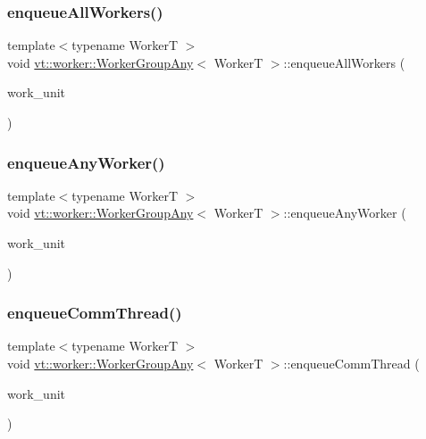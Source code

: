 \subsubsection{\texorpdfstring{enqueue\+All\+Workers()}{enqueueAllWorkers()}}
{\footnotesize\ttfamily template$<$typename WorkerT $>$ \\
void \hyperlink{structvt_1_1worker_1_1_worker_group_any}{vt\+::worker\+::\+Worker\+Group\+Any}$<$ WorkerT $>$\+::enqueue\+All\+Workers (\begin{DoxyParamCaption}\item[{\hyperlink{namespacevt_1_1worker_a59d2fcdafa81fc0af7f921a258e42202}{Work\+Unit\+Type} const \&}]{work\+\_\+unit }\end{DoxyParamCaption})}

\mbox{\label{structvt_1_1worker_1_1_worker_group_any_a9f8a255853db11824212dcba4faaaf13}} 
\subsubsection{\texorpdfstring{enqueue\+Any\+Worker()}{enqueueAnyWorker()}}
{\footnotesize\ttfamily template$<$typename WorkerT $>$ \\
void \hyperlink{structvt_1_1worker_1_1_worker_group_any}{vt\+::worker\+::\+Worker\+Group\+Any}$<$ WorkerT $>$\+::enqueue\+Any\+Worker (\begin{DoxyParamCaption}\item[{\hyperlink{namespacevt_1_1worker_a59d2fcdafa81fc0af7f921a258e42202}{Work\+Unit\+Type} const \&}]{work\+\_\+unit }\end{DoxyParamCaption})}

\mbox{\label{structvt_1_1worker_1_1_worker_group_any_a876ea312a8cefa1caa8bbf86caff208d}} 
\subsubsection{\texorpdfstring{enqueue\+Comm\+Thread()}{enqueueCommThread()}}
{\footnotesize\ttfamily template$<$typename WorkerT $>$ \\
void \hyperlink{structvt_1_1worker_1_1_worker_group_any}{vt\+::worker\+::\+Worker\+Group\+Any}$<$ WorkerT $>$\+::enqueue\+Comm\+Thread (\begin{DoxyParamCaption}\item[{\hyperlink{namespacevt_1_1worker_a59d2fcdafa81fc0af7f921a258e42202}{Work\+Unit\+Type} const \&}]{work\+\_\+unit }\end{DoxyParamCaption})}

